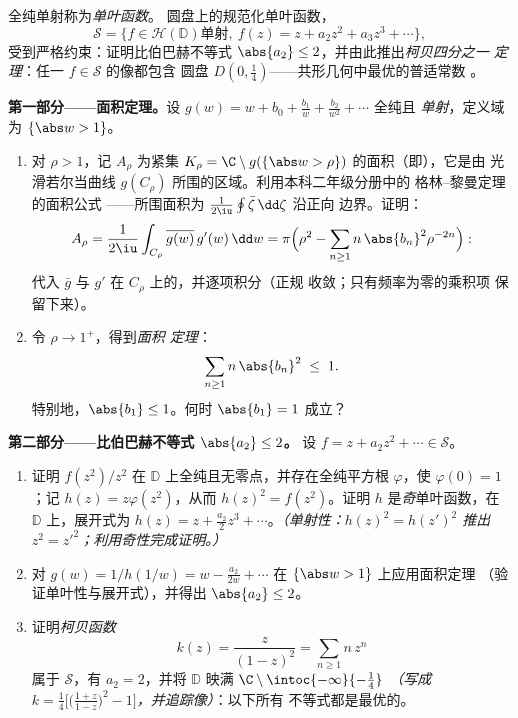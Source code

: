 \begin{problem}\label{pb:b3:conformal:1}
全纯单射称为\emph{单叶函数}。
圆盘上的规范化单叶函数，
\[
\mathcal S = \bigl\{f \in \mathcal H(\mathbb D) \text{
单射},\ f(z) = z + a_2z^2 + a_3z^3 + \cdots\bigr\},
\]
受到严格约束：证明比伯巴赫不等式
$\abs{a_2} \leq 2$，并由此推出\emph{柯贝四分之一
定理}：任一 $f \in \mathcal S$ 的像都包含
圆盘 $D(0, \frac14)$——共形几何中最优的普适常数
。

\medskip
\noindent\textbf{第一部分——面积定理。}设 $g(w) = w
+ b_0 + \frac{b_1}w + \frac{b_2}{w^2} + \cdots$ 全纯且
\emph{单射}，定义域为 $\{\abs w > 1\}$。
\begin{enumerate}
  \item 对 $\rho > 1$，记 $A_\rho$ 为紧集
        $K_\rho = \C\setminus
        g(\{\abs w > \rho\})$ 的面积（即），它是由
        光滑若尔当曲线 $g(C_\rho)$ 所围的区域。利用本科二年级分册中的
        格林–黎曼定理的面积公式
——所围面积为 $\frac1{2\iu}
        \oint\bar\zeta\,\dd\zeta$ 沿正向
        边界。证明：
        \[
        A_\rho = \frac{1}{2\iu}\int_{C_\rho}
        \overline{g(w)}\,g'(w)\,\dd w
        = \pi\Bigl(\rho^2 -
        \sum_{n\geq1}n\,\abs{b_n}^2\rho^{-2n}\Bigr) :
        \]
        代入 $\bar g$ 与 $g'$ 在
        $C_\rho$ 上的，并逐项积分（正规
        收敛；只有频率为零的乘积项
        保留下来）。
  \item 令 $\rho \to 1^+$，得到\emph{面积
        定理}：
        \[
        \sum_{n\geq1}n\,\abs{b_n}^2 \;\leq\; 1 .
        \]
        特别地，$\abs{b_1} \leq 1$。何时 $\abs{b_1}
        = 1$ 成立？
\end{enumerate}

\medskip
\noindent\textbf{第二部分——比伯巴赫不等式 $\abs{a_2} \leq
2$。} 设 $f = z + a_2z^2 + \cdots \in \mathcal S$。
\begin{enumerate}[resume]
  \item 证明 $f(z^2)/z^2$ 在
        $\mathbb D$ 上全纯且无零点，并存在全纯平方根
        $\varphi$，使 $\varphi(0) = 1$；记 $h(z) =
        z\varphi(z^2)$，从而 $h(z)^2 = f(z^2)$。证明
        $h$ 是\emph{奇}单叶函数，在 $\mathbb
        D$ 上，展开式为 $h(z) = z + \frac{a_2}2z^3 +
        \cdots$。\emph{（单射性：$h(z)^2 = h(z')^2$
        推出 $z^2 = z'^2$；利用奇性完成证明。）}
  \item 对 $g(w) = 1/h(1/w) = w -
        \frac{a_2}{2w} + \cdots$ 在 $\{\abs w > 1\}$ 上应用面积定理
        （验证单叶性与展开式），并得出
        $\abs{a_2} \leq 2$。
  \item 证明\emph{柯贝函数}
        \[
        k(z) = \frac{z}{(1 - z)^2} = \sum_{n\geq1}n\,z^n
        \]
        属于 $\mathcal S$，有 $a_2 = 2$，并将
        $\mathbb D$ 映满 $\C\setminus\intoc{-\infty}{-\frac14}$
        \emph{（写成 $k = \frac14\bigl[\bigl(\frac{1+z}{1 -
        z}\bigr)^2 - 1\bigr]$，并追踪像）}：以下所有
        不等式都是最优的。
\end{enumerate}


\end{problem}
